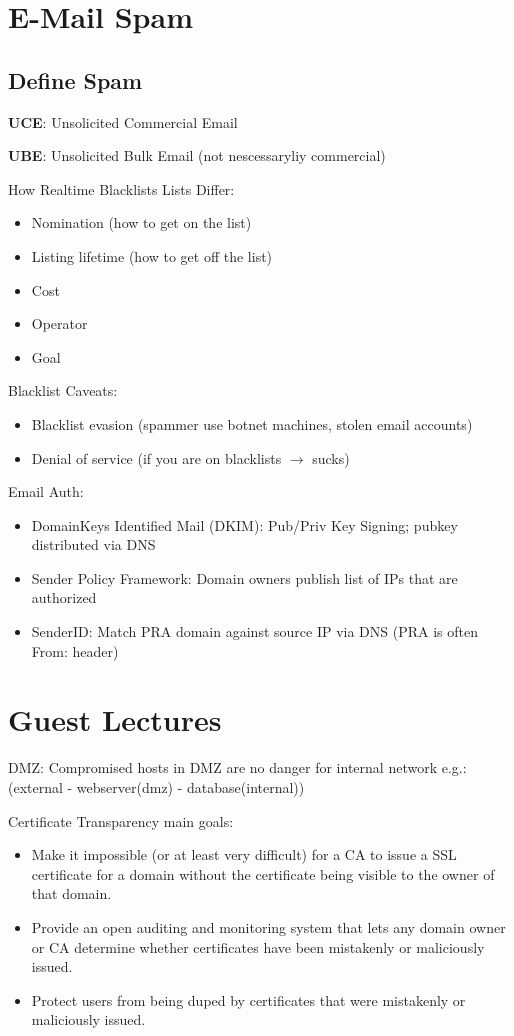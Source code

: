 \documentclass[fs, footer]{latex4ei}
\begin{document}
\begin{multicols*}{4}
\section{E-Mail Spam}
\subsection{Define Spam}
\textbf{UCE}: Unsolicited Commercial Email

\textbf{UBE}: Unsolicited Bulk Email (not nescessaryliy commercial)

How Realtime Blacklists Lists Differ:
\begin{itemize}
	\item Nomination (how to get on the list)
	\item Listing lifetime (how to get off the list)
	\item Cost
	\item Operator
	\item Goal
\end{itemize}

Blacklist Caveats:
\begin{itemize}
	\item Blacklist evasion (spammer use botnet machines, stolen email accounts)
	\item Denial of service (if you are on blacklists $\rightarrow$ sucks)
\end{itemize}

Email Auth:
\begin{itemize}
	\item DomainKeys Identified Mail (DKIM): Pub/Priv Key Signing; pubkey distributed via DNS
	\item Sender Policy Framework: Domain owners publish list of IPs that are authorized
	\item SenderID: Match PRA domain against source IP via DNS (PRA is often From: header)
	\end{itemize}
	
\section{Guest Lectures}
DMZ: Compromised hosts in DMZ are no danger for internal network e.g.:(external - webserver(dmz) - database(internal))

Certificate Transparency  main goals:
\begin{itemize}
	\item Make it impossible (or at least very difficult) for a CA to issue a SSL certificate for a domain without the certificate being visible to the owner of that domain.
	\item Provide an open auditing and monitoring system that lets any domain owner or CA determine whether certificates have been mistakenly or maliciously issued.
	\item Protect users from being duped by certificates that were mistakenly or maliciously issued.
\end{itemize}

\end{multicols*}

\end{document}
